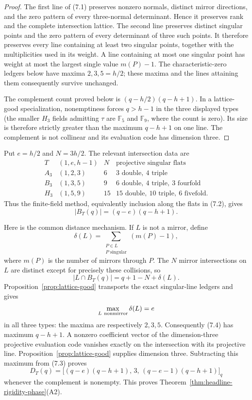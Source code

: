 \documentclass[11pt]{article}
\theoremstyle{definition}
\theoremstyle{remark}
\newcommand{\F}{\mathbb{F}}
\begin{document}
\begin{proof}
The first line of (7.1) preserves nonzero normals, distinct mirror
directions, and the zero pattern of every three-normal determinant.
Hence it preserves rank and the complete intersection lattice.  The
second line preserves distinct singular points and the zero pattern of
every determinant of three such points.  It therefore preserves every
line containing at least two singular points, together with the
multiplicities used in its weight.  A line containing at most one
singular point has weight at most the largest single value $m(P)-1$.
The characteristic-zero ledgers below have maxima $2,3,5=h/2$; these
maxima and the lines attaining them consequently survive unchanged.

The complement count proved below is
$(q-h/2)(q-h+1)$.  In a lattice-good specialization, nonemptiness forces
$q>h-1$ in the three displayed types (the smaller $H_3$ fields admitting
$\tau$ are $\F_5$ and $\F_9$, where the count is zero).  Its size is
therefore strictly greater than the maximum $q-h+1$ on one line.  The
complement is not collinear and its evaluation code has dimension three.
\end{proof}

Put $e=h/2$ and $N=3h/2$.  The relevant intersection data are
\[
\begin{array}{c|c|c|c}
T&(1,e,h-1)&N&\text{projective singular flats}\\ \hline
A_3&(1,2,3)&6&3\text{ double},\ 4\text{ triple}\\
B_3&(1,3,5)&9&6\text{ double},\ 4\text{ triple},\ 3\text{ fourfold}\\
H_3&(1,5,9)&15&15\text{ double},\ 10\text{ triple},\ 6\text{ fivefold}.
\end{array}                                                    \tag{7.2}
\]
Thus the finite-field method, equivalently inclusion along the flats in
(7.2), gives
\[
 |B_T(q)|=(q-e)(q-h+1).                              \tag{7.3}
\]

Here is the common distance mechanism.  If $L$ is not a mirror, define
\[
 \delta(L)=\sum_{\substack{P\in L\\P\text{ singular}}}(m(P)-1),
\]
where $m(P)$ is the number of mirrors through $P$.  The $N$ mirror
intersections on $L$ are distinct except for precisely these collisions,
so
\[
 |L\cap B_T(q)|=q+1-N+\delta(L).                     \tag{7.4}
\]
Proposition~\ref{prop:lattice-good} transports the exact singular-line
ledgers and gives
\[
 \max_{L\ {\rm nonmirror}}\delta(L)=e
\]
in all three types: the maxima are respectively $2,3,5$.  Consequently
(7.4) has maximum $q-h+1$.  A nonzero coefficient vector of the
dimension-three projective evaluation code vanishes exactly on the
intersection with its projective line.  Proposition~\ref{prop:lattice-good}
supplies dimension three.  Subtracting this maximum from (7.3) proves
\[
 D_T(q)=
 \bigl[(q-e)(q-h+1),\,3,\,(q-e-1)(q-h+1)\bigr]_q
                                                               \tag{7.5}
\]
whenever the complement is nonempty.  This proves
Theorem~\ref{thm:headline-rigidity-phase}(A2).
\end{document}
